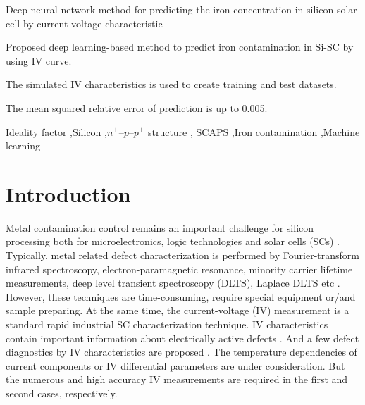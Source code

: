 \documentclass[a4paper,fleqn]{cas-sc}
\begin{document}

Deep neural network method for predicting the iron concentration in silicon solar cell by current-voltage characteristic

\begin{highlights}
\item Proposed deep learning-based method to predict iron contamination in Si-SC by using IV curve.
\item The simulated IV characteristics is used to create training and test datasets.
\item The mean squared relative error of prediction is up to 0.005.
\end{highlights}

\begin{keywords}
Ideality factor \sep Silicon \sep $n^+$--$p$--$p^+$ structure \sep
SCAPS \sep Iron contamination \sep Machine learning
\end{keywords}


\maketitle


\section{Introduction}


Metal  contamination control remains an important challenge for silicon processing both for microelectronics, logic technologies and solar cells (SCs) \citep{Claers2018,ZHU2016192,FeB:Schmidt,IronSC}.
Typically, metal related defect characterization is performed by Fourier-transform infrared spectroscopy,
electron-paramagnetic resonance,
minority carrier lifetime measurements,
deep level transient spectroscopy (DLTS),
Laplace DLTS etc \citep{Schroder2006,HowMuchPhysics,LaplDLTS}.
However, these techniques are time-consuming, require special equipment or/and sample preparing.
At the same time, the current-voltage (IV) measurement is a  standard  rapid industrial SC characterization technique.
IV characteristics contain important information about electrically active defects \citep{HowMuchPhysics,BulyarJAP}.
And a few  defect diagnostics by IV characteristics are proposed
\citep{HowMuchPhysics,BulyarJAP,BulyarSSE,Claeys2019,simoen2007}.
The temperature dependencies of current components \citep{Claeys2019,simoen2007}
or IV differential parameters \citep{BulyarJAP,BulyarSSE} are under consideration.
But the numerous and high accuracy IV measurements are required in the first and second cases, respectively.
\end{document}
